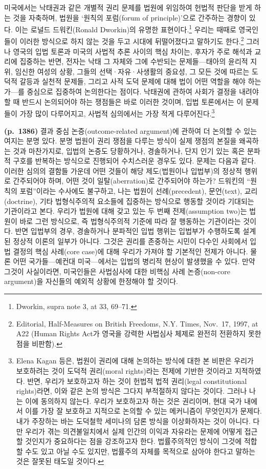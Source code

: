 \documentclass[a4paper,12pt,oneside]{article}  %
\begin{document}
미국에서는 낙태권과 같은 개별적 권리 문제를 법원에 위임하여 헌법적
판단을 받게 하는 것을 자축하며, 법원을 `원칙의 포럼(forum of
principle)'으로 간주하는 경향이 있다. 이는 로널드 드워킨(Ronald
Dworkin)의 유명한 표현이다.\footnote{Dworkin, supra note 3, at 33,
  69--71.} 우리는 때때로 영국인들이 이러한 방식으로 하지 않는 것을 두고
시대에 뒤떨어졌다고 말하기도 한다.\footnote{Editorial, Half-Measures on
  British Freedoms, N.Y. Times, Nov.~17, 1997, at A22 (Human Rights
  Act가 영국을 강력한 사법심사 체제로 완전히 전환하지 못한 점을 비판함).}
그러나 영국의 입법 토론과 미국의 사법적 추론 사이의 핵심 차이는, 후자가
주로 해석과 교리에 집중하는 반면, 전자는 낙태 그 자체와 그에 수반되는
문제들---태아의 윤리적 지위, 임신한 여성의 상황, 그들의
선택·자유·사생활의 중요성, 그 모든 것에 따르는 도덕적 갈등과 실천적
문제들, 그리고 사적 도덕 문제에 대해 법이 어떤 역할을 해야 하는가---를
중심으로 집중하여 논의한다는 점이다. 낙태권에 관하여 사회가 결정을
내려야 할 때 반드시 논의되어야 하는 쟁점들은 바로 이러한 것이며, 입법
토론에서는 이 문제들이 가장 많이 다루어지고, 사법적 심의에서는 가장 적게
다루어진다.\footnote{Elena Kagan 등은, 법원이 권리에 대해 논의하는
  방식에 대한 본 비판은 우리가 보호하려는 것이 도덕적 권리(moral
  rights)라는 전제에 기반한 것이라고 지적하였다. 반면, 우리가 보호하고자
  하는 것이 헌법적 법적 권리(legal constitutional rights)라면, 이와 같은
  논의 방식은 그다지 부적절하지 않다는 것이다. 그러나 나는 이에 동의하지
  않는다. 우리가 보호하고자 하는 것은 권리이며, 현대 국가 내에서 이를
  가장 잘 보호하고 지적으로 논의할 수 있는 메커니즘이 무엇인지가 문제다.
  내가 주장하는 바는 도덕철학 세미나의 담론 방식을 이상화하자는 것이
  아니다. 다만 우리가 겪는 의견불일치에서 실제 인간의 이익과 자유라는
  문제에 어떻게 접근할 것인지가 중요하다는 점을 강조하고자 한다.
  법률주의적인 방식이 그것에 적합할 수도 있고 아닐 수도 있지만, 법률주의
  자체를 목적으로 삼아야 한다고 말하는 것은 잘못된 태도일 것이다.}

\textbf{(p.~1386)} 결과 중심 논증(outcome-related argument)에 관하여 더
논의할 수 있는 여지는 분명 있다. 분명 법원이 권리 쟁점을 다루는 방식이
실제 쟁점의 본질을 왜곡하는 것과 마찬가지로, 입법의 논증도 당황하거나,
경솔하거나, 단지 인기 있는 혹은 분파적 구호를 반복하는 방식으로 진행되어
수치스러운 경우도 있다. 문제는 다음과 같다. 이러한 심의의 결함들 가운데
어떤 것들이 해당 제도(법원이나 입법부)의 정상적 행위로 간주되어야 하며,
어떤 것이 일탈(aberration)로 간주되어야 하는가? 드워킨의 ``원칙의
포럼''이라는 수사에도 불구하고, 나는 법원이 선례(precedent), 문언(text),
교리(doctrine), 기타 법형식주의적 요소들에 집중하는 방식으로 행동할
것이라 기대되는 기관이라고 본다. 우리가 법원에 대해 갖고 있는 두 번째
전제(assumption two)는 법원이 바로 그런 방식으로, 즉 법형식주의적 기준에
따라 잘 행동하는 기관이라는 것이다. 반면 입법부의 경우, 경솔하거나
분파적인 입법 행위는 입법부가 수행하도록 설계된 정상적 이론의 일부가
아니다. 그것은 권리를 존중하는 시민이 다수인 사회에서 입법 결정의 핵심
사례(core case)에 대해 우리가 가져야 할 기본적인 전제가 아니다. 물론
어떤 국가들---예컨대 미국---에서는 입법의 병리적 현상이 발생했을 수
있다. 만약 그것이 사실이라면, 미국인들은 사법심사에 대한 비핵심 사례
논증(non-core argument)을 자신들의 예외적 상황에 한정해야 할 것이다.
\end{document}
